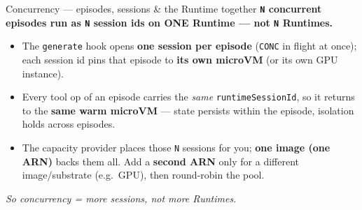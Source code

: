 \documentclass[
  10pt,
  ignorenonframetext,
  aspectratio=169,
  t]{beamer}
\providecommand{\tightlist}{%
  \setlength{\itemsep}{0pt}\setlength{\parskip}{0pt}}
\begin{document}
\begin{frame}{Concurrency --- episodes, sessions \& the Runtime
together}
\protect\hypertarget{concurrency-episodes-sessions-the-runtime-together}{}
\textbf{\texttt{N} concurrent episodes run as \texttt{N} session ids on
ONE Runtime --- not \texttt{N} Runtimes.}

\begin{itemize}
\tightlist
\item
  The \texttt{generate} hook opens \textbf{one session per episode}
  (\texttt{CONC} in flight at once); each session id pins that episode
  to \textbf{its own microVM} (or its own GPU instance).
\item
  Every tool op of an episode carries the \emph{same}
  \texttt{runtimeSessionId}, so it returns to the \textbf{same warm
  microVM} --- state persists within the episode, isolation holds across
  episodes.
\item
  The capacity provider places those \texttt{N} sessions for you;
  \textbf{one image (one ARN)} backs them all. Add a \textbf{second ARN}
  only for a different image/substrate (e.g.~GPU), then round-robin the
  pool.
\end{itemize}

\emph{So concurrency = more sessions, not more Runtimes.}
\end{frame}
\end{document}
